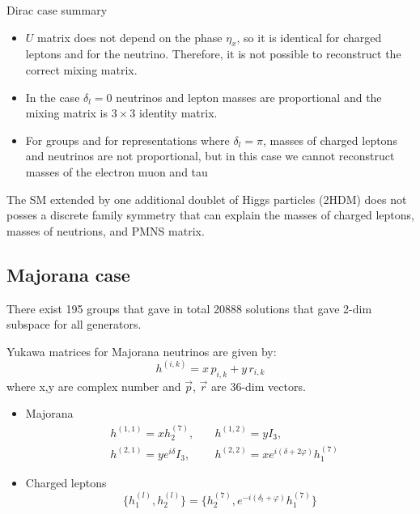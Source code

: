 \documentclass{beamer}
\begin{document}
\begin{frame}{Dirac case summary}
\begin{itemize}
\item $U$  matrix  does  not  depend  on  the  phase $\eta_x$,  so  it  is identical for charged leptons and for the neutrino. \alert{Therefore, it is not possible to reconstruct the correct mixing matrix}.  
\item In the case $\delta_l= 0$ neutrinos and lepton masses are proportional and the mixing matrix is $3\times3$ identity matrix.
\item For groups and for representations where $\delta_l=\pi$, masses of charged leptons and neutrinos are not proportional, but in this case we cannot reconstruct masses of the electron muon and tau
\end{itemize} 

\alert{The SM extended by one additional doublet of Higgs particles (2HDM) does not posses a discrete family symmetry that can explain the masses of charged leptons, masses of neutrions, and PMNS matrix.}

\end{frame}

\subsection{Majorana case}
\begin{frame}
There exist \alert{195 groups} that gave in total 20888 solutions that gave \alert{2-dim subspace for all generators}. 

Yukawa matrices for Majorana neutrinos are given by:
$$h^{(i,k)}=x \,p_{i,k} + y\, r_{i,k}$$
where x,y are complex number and $\vec{p}$, $\vec{r}$ are 36-dim vectors.

\begin{itemize}
\item Majorana
\begin{eqnarray}
&h^{(1,1)}= x h_{2}^{(7)},\quad &h^{(1,2)}= y I_{3}, \nonumber \\
&h^{(2,1)}= y e^{i \delta} I_{3},\quad  &h^{(2,2)}= x e^{i(\delta + 2\varphi)} h_{1}^{(7)}\nonumber
\end{eqnarray}
\item Charged leptons 
$$
\lbrace h_{1}^{(l)}, h_{2}^{(l)}\rbrace = \lbrace h_{2}^{(7)}, e^{-i( \delta_{l} +\varphi)} h_{1}^{(7)}\rbrace $$
\end{itemize}
\end{frame}
\end{document}
